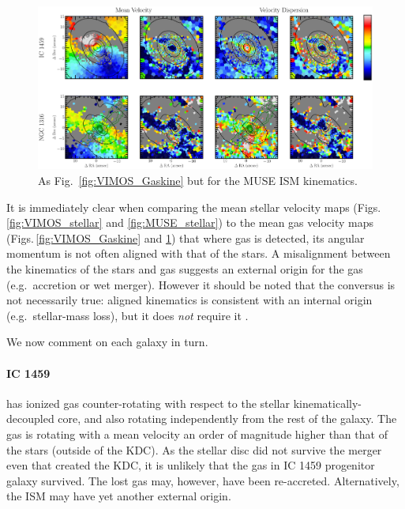 	\begin{figure}
		\centering
		\includegraphics[height=0.31\textheight]{chapter5/muse/kin.png}
		\caption[MUSE ISM kinematic maps]{As Fig.\ \ref{fig:VIMOS_Gaskine} but for the MUSE ISM kinematics.}
		\label{fig:MUSE_Gaskine}
	\end{figure}


	It is immediately clear when comparing the mean stellar velocity maps (Figs.\,\ref{fig:VIMOS_stellar} and \ref{fig:MUSE_stellar}) to the mean gas velocity maps (Figs.\,\ref{fig:VIMOS_Gaskine} and \ref{fig:MUSE_Gaskine}) that where gas is detected, its angular momentum is not often aligned with that of the stars. A misalignment between the kinematics of the stars and gas suggests an external origin for the gas (e.g.\ accretion or wet merger). However it should be noted that the conversus is not necessarily true: aligned kinematics is consistent with an internal origin (e.g.\ stellar-mass loss), but it does \emph{not} require it \citep[e.g.][]{Davis2011a}. 

	We now comment on each galaxy in turn.

	\paragraph{IC 1459} has ionized gas counter-rotating with respect to the stellar kinematically-decoupled core, and also rotating independently from the rest of the galaxy. The gas is rotating with a mean velocity an order of magnitude higher than that of the stars (outside of the KDC). As the stellar disc did not survive the merger even that created the KDC, it is unlikely that the gas in IC 1459 progenitor galaxy survived. The lost gas may, however, have been re-accreted. Alternatively, the ISM may have yet another external origin. 

